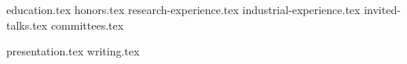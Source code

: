 \documentclass[11pt, a4paper]{awesome-cv}
\newcommand*{\sectiondir}{resume/}
\begin{document}

{education.tex}
{honors.tex}
{research-experience.tex}
{industrial-experience.tex}
{invited-talks.tex}
{committees.tex}
\nocite{*}


% 




\nocite{*}

{presentation.tex}
{writing.tex}
\end{document}
